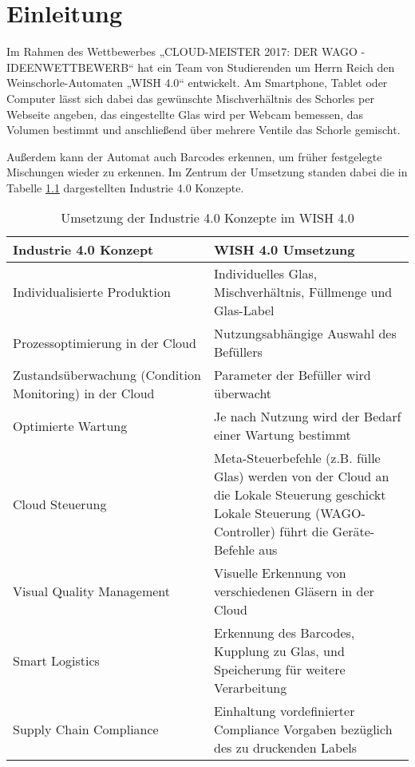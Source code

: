 \chapter{Einleitung}
Im Rahmen des Wettbewerbes „CLOUD-MEISTER 2017: DER WAGO - IDEENWETTBEWERB“ hat ein Team von Studierenden um Herrn Reich den Weinschorle-Automaten „WISH 4.0“ entwickelt. Am Smartphone, Tablet oder Computer lässt sich dabei das gewünschte Mischverhältnis des Schorles per Webseite angeben, das eingestellte Glas wird per Webcam bemessen, das Volumen bestimmt und anschließend über mehrere Ventile das Schorle gemischt.

Außerdem kann der Automat auch Barcodes erkennen, um früher festgelegte Mischungen wieder zu erkennen. Im Zentrum der Umsetzung standen dabei die in Tabelle \ref{tab:Umsetzung_Industrie_4_0} dargestellten Industrie 4.0 Konzepte.

\begin{table}
	\caption{Umsetzung der Industrie 4.0 Konzepte im WISH 4.0}
	\label{tab:Umsetzung_Industrie_4_0}
	\begin{tabular}{p{0.5\linewidth}|p{0.5\linewidth}}
		Industrie 4.0 Konzept & WISH 4.0 Umsetzung \\
		\hline \hline
		Individualisierte Produktion & Individuelles Glas, Mischverhältnis, Füllmenge und Glas-Label \\
		\hline
		Prozessoptimierung in der Cloud & Nutzungsabhängige Auswahl des Befüllers \\
		\hline
		Zustandsüberwachung (Condition Monitoring) in der Cloud & Parameter der Befüller wird überwacht \\
		\hline
		Optimierte Wartung & Je nach Nutzung wird der Bedarf einer Wartung bestimmt \\
		\hline
		Cloud Steuerung & Meta-Steuerbefehle (z.B. fülle Glas) werden von der Cloud an die Lokale Steuerung geschickt
		Lokale Steuerung (WAGO-Controller) führt die Geräte-Befehle aus \\
		\hline
		Visual Quality Management & Visuelle Erkennung von verschiedenen Gläsern in der Cloud \\
		\hline
		Smart Logistics  & Erkennung des Barcodes, Kupplung zu Glas, und Speicherung für weitere Verarbeitung \\
		\hline
		Supply Chain Compliance & Einhaltung vordefinierter Compliance Vorgaben bezüglich des zu druckenden Labels \\
	\end{tabular}
\end{table}